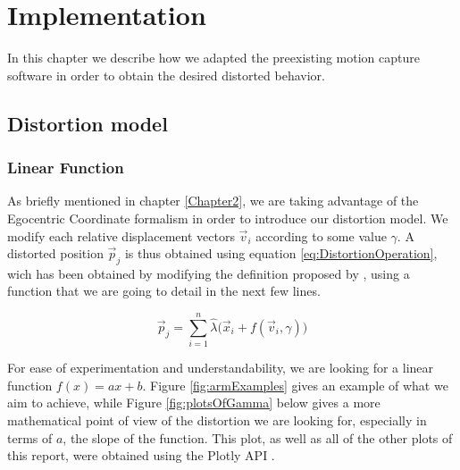 
\chapter{Implementation} %

\label{Chapter3} %

In this chapter we describe how we adapted the preexisting motion capture software in order to obtain the desired distorted behavior.

\section{Distortion model}

\subsection*{Linear Function}

As briefly mentioned in chapter \ref{Chapter2}, we are taking advantage of the Egocentric Coordinate formalism in order to introduce our distortion model. We modify each relative displacement vectors $\vec{v}_i$ according to some value $\gamma$. A distorted position $\vec{p}_j$ is thus obtained using equation \ref{eq:DistortionOperation}, wich has been obtained by modifying the definition proposed by \cite{molla2017egocentric}, using a function that we are going to detail in the next few lines.

\begin{equation}
\label{eq:DistortionOperation}
\vec{p}_j = \displaystyle\sum_{i=1}^{n} \hat{\lambda}\big(\vec{x}_i + f(\vec{v}_i,\gamma )\big)
\end{equation}

\noindent
For ease of experimentation and understandability, we are looking for a linear function $f(x) = ax + b$. Figure \ref{fig:armExamples} gives an example of what we aim to achieve, while Figure \ref{fig:plotsOfGamma} below gives a more mathematical point of view of the distortion we are looking for, especially in terms of $a$, the slope of the function. This plot, as well as all of the other plots of this report, were obtained using the Plotly API \cite{plotly}.

